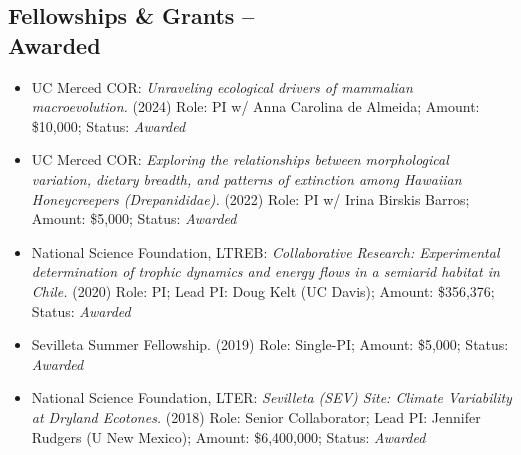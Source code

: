 \documentclass[margin,line,12pt]{res}
\begin{document}
\begin{resume}



\section{\sc Fellowships \& Grants -- \\ Awarded}
\begin{itemize}

\item UC Merced COR: \emph{Unraveling ecological drivers of mammalian macroevolution.} (2024) Role: PI w/ Anna Carolina de Almeida; Amount: \$10,000; Status: \emph{Awarded}

\item UC Merced COR: \emph{Exploring the relationships between morphological variation, dietary breadth, and patterns of extinction among Hawaiian Honeycreepers (Drepanididae).} (2022) Role: PI w/ Irina Birskis Barros; Amount: \$5,000; Status: \emph{Awarded}
  
\item National Science Foundation, LTREB: \emph{Collaborative Research: Experimental determination of trophic dynamics and energy flows in a semiarid habitat in Chile.} (2020) Role: PI; Lead PI: Doug Kelt (UC Davis); Amount: \$356,376; Status: \emph{Awarded}

\item Sevilleta Summer Fellowship. (2019) Role: Single-PI; Amount: \$5,000; Status: \emph{Awarded}

\item National Science Foundation, LTER: \emph{Sevilleta (SEV) Site: Climate Variability at Dryland Ecotones.} (2018) Role: Senior Collaborator; Lead PI: Jennifer Rudgers (U New Mexico); Amount: \$6,400,000; Status: \emph{Awarded}


\end{itemize}
\end{resume}
\end{document}
